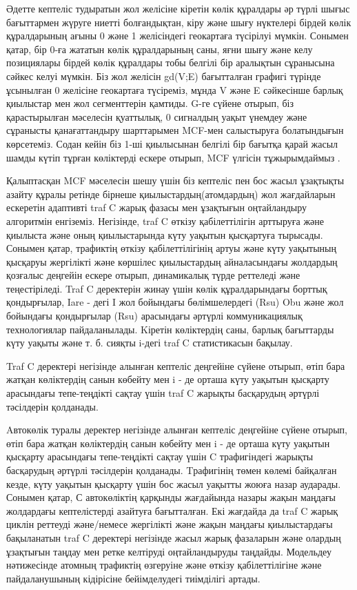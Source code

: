 \begin{multicols}{2}
Әдетте кептеліс тудыратын жол желісіне кіретін көлік құралдары әр түрлі
шығыс бағыттармен жүруге ниетті болғандықтан, кіру және шығу нүктелері
бірдей көлік құралдарының ағыны 0 және 1 желісіндегі геокартаға
түсірілуі мүмкін. Сонымен қатар, бір 0-ға жататын көлік құралдарының
саны, яғни шығу және келу позициялары бірдей көлік құралдары тобы
белгілі бір аралықтын сұранысына сәйкес келуі мүмкін. Біз жол желісін
gd(V;E) бағытталған графигі түрінде ұсынылған 0 желісіне геокартаға
түсіреміз, мұнда V және E сәйкесінше барлық қиылыстар мен жол
сегменттерін қамтиды. G-ге сүйене отырып, біз қарастырылған мәселесін
қуаттылық, 0 сигналдың уақыт үнемдеу және сұранысты қанағаттандыру
шарттарымен MCF-мен салыстыруға болатындығын көрсетеміз. Содан кейін біз
1-ші қиылысынан белгілі бір бағытқа қарай жасыл шамды күтіп тұрған
көліктерді ескере отырып, MCF үлгісін тұжырымдаймыз .

Қалыптасқан MCF мәселесін шешу үшін біз кептеліс пен бос жасыл ұзақтықты
азайту құралы ретінде бірнеше қиылыстардың(атомдардың) жол жағдайларын
ескеретін адаптивті traf C жарық фазасы мен ұзақтығын оңтайландыру
алгоритмін енгіземіз. Негізінде, traf C өткізу қабілеттілігін арттыруға
және қиылыста және оның қиылыстарында күту уақытын қысқартуға тырысады.
Сонымен қатар, трафиктің өткізу қабілеттілігінің артуы және күту
уақытының қысқаруы жергілікті және көршілес қиылыстардың айналасындағы
жолдардың қозғалыс деңгейін ескере отырып, динамикалық түрде реттеледі
және теңестіріледі. Traf C деректерін жинау үшін көлік құралдарындағы
борттық қондырғылар, Iare - дегі I жол бойындағы бөлімшелердегі (Rsu)
Obu және жол бойындағы қондырғылар (Rsu) арасындағы әртүрлі
коммуникациялық технологиялар пайдаланылады. Kіретін көліктердің саны,
барлық бағыттарды күту уақыты және т. б. сияқты i-дегі traf C
статистикасын бақылау.

Traf C деректері негізінде алынған кептеліс деңгейіне сүйене отырып,
өтіп бара жатқан көліктердің санын көбейту мен i - де орташа күту
уақытын қысқарту арасындағы тепе-теңдікті сақтау үшін traf C жарықты
басқарудың әртүрлі тәсілдерін қолданады.

Aвтокөлік туралы деректер негізінде алынған кептеліс деңгейіне сүйене
отырып, өтіп бара жатқан көліктердің санын көбейту мен i - де орташа
күту уақытын қысқарту арасындағы тепе-теңдікті сақтау үшін C
трафигіндегі жарықты басқарудың әртүрлі тәсілдерін қолданады. Tрафигінің
төмен көлемі байқалған кезде, күту уақытын қысқарту үшін бос жасыл
уақытты жоюға назар аударады. Сонымен қатар, С автокөліктің қарқынды
жағдайында назары жақын маңдағы жолдардағы кептелістерді азайтуға
бағытталған. Екі жағдайда да traf C жарық циклін реттеуді және/немесе
жергілікті және жақын маңдағы қиылыстардағы бақыланатын traf C деректері
негізінде жасыл жарық фазаларын және олардың ұзақтығын таңдау мен ретке
келтіруді оңтайландыруды таңдайды. Модельдеу нәтижесінде атомның
трафиктің өзгеруіне және өткізу қабілеттілігіне және пайдаланушының
кідірісіне бейімделудегі тиімділігі артады.


\end{multicols}
